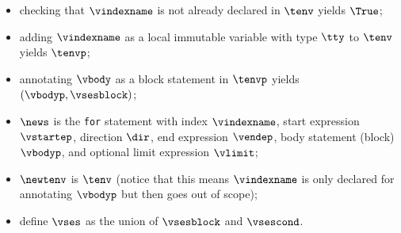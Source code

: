 \begin{itemize}
  \item checking that $\vindexname$ is not already declared in $\tenv$ yields $\True$\ProseOrTypeError;
  \item adding $\vindexname$ as a local immutable variable with type $\tty$ to $\tenv$ yields $\tenvp$;
  \item annotating $\vbody$ as a block statement in $\tenvp$ yields $(\vbodyp, \vsesblock)$\ProseOrTypeError;
  \item $\news$ is the \texttt{for} statement with index $\vindexname$,
        start expression $\vstartep$, direction $\dir$,
        end expression $\vendep$,
        body statement (block) $\vbodyp$, and
        optional limit expression $\vlimit$;
  \item $\newtenv$ is $\tenv$ (notice that this means $\vindexname$ is only declared for annotating $\vbodyp$ but then goes
        out of scope);
  \item define $\vses$ as the union of $\vsesblock$ and $\vsescond$.
\end{itemize}
\FormallyParagraph
